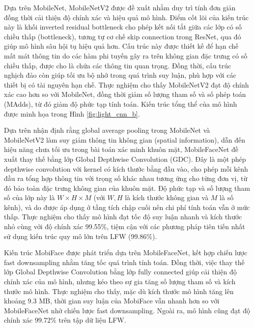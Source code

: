 Dựa trên MobileNet, MobileNetV2\cite{ARC_Sandler_2018_CVPR} được đề xuất nhằm duy trì tính đơn giản đồng thời cải thiện độ chính xác và hiệu quả mô hình. Điểm cốt lõi của kiến trúc này là khối inverted residual bottleneck cho phép kết nối tắt giữa các lớp có số chiều thấp (bottleneck), tương tự cơ chế skip connection trong ResNet\cite{ARC_He_2016_CVPR}, qua đó giúp mô hình sâu hội tụ hiệu quả hơn. Cấu trúc này được thiết kế để hạn chế mất mát thông tin do các hàm phi tuyến gây ra trên không gian đặc trưng có số chiều thấp, được cho là chứa các thông tin quan trọng. Đồng thời, cấu trúc nghịch đảo còn giúp tối ưu bộ nhớ trong quá trình suy luận, phù hợp với các thiết bị có tài nguyên hạn chế. Thực nghiệm cho thấy MobileNetV2 đạt độ chính xác cao hơn so với MobileNet, đồng thời giảm số lượng tham số và số phép toán (MAdds), từ đó giảm độ phức tạp tính toán. Kiến trúc tổng thể của mô hình được minh họa trong Hình \ref{fig:light_cnn_b}.

Dựa trên nhận định rằng global average pooling trong MobileNet và MobileNetV2 làm suy giảm thông tin không gian (spatial information), dẫn đến hiệu năng chưa tối ưu trong bài toán xác minh khuôn mặt, MobileFaceNet \cite{16_chen_2018_mobilefacenets} đề xuất thay thế bằng lớp Global Depthwise Convolution (GDC). Đây là một phép depthwise convolution với kernel có kích thước bằng đầu vào, cho phép mỗi kênh đầu ra tổng hợp thông tin với trọng số khác nhau tương ứng cho từng đơn vị, từ đó bảo toàn đặc trưng không gian của khuôn mặt. Độ phức tạp và số lượng tham số của lớp này là $W \times H \times M$ (với $W, H$ là kích thước không gian và $M$ là số kênh), và do được áp dụng ở tầng tích chập cuối nên chi phí tính toán vẫn ở mức thấp. Thực nghiệm cho thấy mô hình đạt tốc độ suy luận nhanh và kích thước nhỏ cùng với độ chính xác 99.55\%, tiệm cận với các phương pháp tiên tiến nhất sử dụng kiến trúc quy mô lớn trên LFW (99.86\%)\cite{2_electronics9081188}.

Kiến trúc MobiFace \cite{ARC_9185981} được phát triển dựa trên MobileFaceNet, kết hợp chiến lược fast downsampling nhằm tăng tốc quá trình tính toán. Đồng thời, việc thay thế lớp Global Depthwise Convolution bằng lớp fully connected giúp cải thiện độ chính xác của mô hình, nhưng kéo theo sự gia tăng số lượng tham số và kích thước mô hình. Thực nghiệm cho thấy, mặc dù kích thước mô hình tăng lên khoảng 9.3 MB, thời gian suy luận của MobiFace vẫn nhanh hơn so với MobileFaceNet nhờ chiến lược fast downsampling. Ngoài ra, mô hình cũng đạt độ chính xác 99.72\% trên tập dữ liệu LFW.

